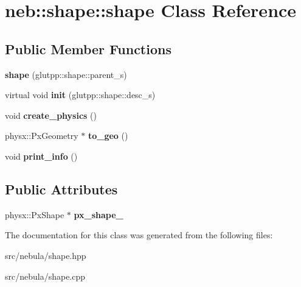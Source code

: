 \hypertarget{classneb_1_1shape_1_1shape}{\section{neb\-:\-:shape\-:\-:shape \-Class \-Reference}
\label{classneb_1_1shape_1_1shape}
}
\subsection*{\-Public \-Member \-Functions}
\begin{DoxyCompactItemize}
\item 
\hypertarget{classneb_1_1shape_1_1shape_a99b6ce85fd11ae4c653af5d224eccf0e}{{\bfseries shape} (glutpp\-::shape\-::parent\-\_\-s)}\label{classneb_1_1shape_1_1shape_a99b6ce85fd11ae4c653af5d224eccf0e}

\item 
\hypertarget{classneb_1_1shape_1_1shape_a6b32b64391220f5b23eabe7f9c4af596}{virtual void {\bfseries init} (glutpp\-::shape\-::desc\-\_\-s)}\label{classneb_1_1shape_1_1shape_a6b32b64391220f5b23eabe7f9c4af596}

\item 
\hypertarget{classneb_1_1shape_1_1shape_af34910feff0944f03ce5a0cd7599f956}{void {\bfseries create\-\_\-physics} ()}\label{classneb_1_1shape_1_1shape_af34910feff0944f03ce5a0cd7599f956}

\item 
\hypertarget{classneb_1_1shape_1_1shape_a6c52cdce2b3575c73d9440fba5e6934e}{physx\-::\-Px\-Geometry $\ast$ {\bfseries to\-\_\-geo} ()}\label{classneb_1_1shape_1_1shape_a6c52cdce2b3575c73d9440fba5e6934e}

\item 
\hypertarget{classneb_1_1shape_1_1shape_ae89b01dc51c8d11d478c4377d5cea38c}{void {\bfseries print\-\_\-info} ()}\label{classneb_1_1shape_1_1shape_ae89b01dc51c8d11d478c4377d5cea38c}

\end{DoxyCompactItemize}
\subsection*{\-Public \-Attributes}
\begin{DoxyCompactItemize}
\item 
\hypertarget{classneb_1_1shape_1_1shape_aede64cf428691b049d68c5f62fd22383}{physx\-::\-Px\-Shape $\ast$ {\bfseries px\-\_\-shape\-\_\-}}\label{classneb_1_1shape_1_1shape_aede64cf428691b049d68c5f62fd22383}

\end{DoxyCompactItemize}


\-The documentation for this class was generated from the following files\-:\begin{DoxyCompactItemize}
\item 
src/nebula/shape.\-hpp\item 
src/nebula/shape.\-cpp\end{DoxyCompactItemize}

